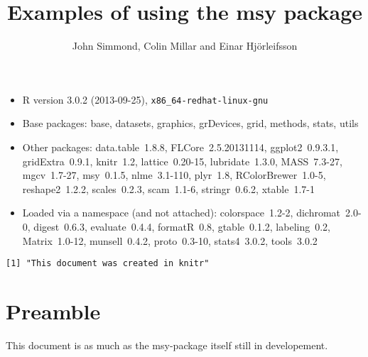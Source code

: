 \documentclass[a4paper]{article}\usepackage{graphicx, color}
\makeatletter
\newenvironment{kframe}{%
 \def\at@end@of@kframe{}%
 \ifinner\ifhmode%
  \def\at@end@of@kframe{\end{minipage}}%
  \begin{minipage}{\columnwidth}%
 \fi\fi%
 \def\FrameCommand##1{\hskip\@totalleftmargin \hskip-\fboxsep
 \colorbox{shadecolor}{##1}\hskip-\fboxsep
     \hskip-\linewidth \hskip-\@totalleftmargin \hskip\columnwidth}%
 \MakeFramed {\advance\hsize-\width
   \@totalleftmargin\z@ \linewidth\hsize
   \@setminipage}}%
 {\par\unskip\endMakeFramed%
 \at@end@of@kframe}
\newenvironment{knitrout}{}{} %
\makeatother
\begin{document}
\title{Examples of using the msy package}

\author{John Simmond, Colin Millar and Einar Hjörleifsson}
\maketitle

\begin{itemize}\raggedright
  \item R version 3.0.2 (2013-09-25), \verb|x86_64-redhat-linux-gnu|
  \item Base packages: base, datasets, graphics, grDevices, grid,
    methods, stats, utils
  \item Other packages: data.table~1.8.8, FLCore~2.5.20131114,
    ggplot2~0.9.3.1, gridExtra~0.9.1, knitr~1.2, lattice~0.20-15,
    lubridate~1.3.0, MASS~7.3-27, mgcv~1.7-27, msy~0.1.5,
    nlme~3.1-110, plyr~1.8, RColorBrewer~1.0-5, reshape2~1.2.2,
    scales~0.2.3, scam~1.1-6, stringr~0.6.2, xtable~1.7-1
  \item Loaded via a namespace (and not attached):
    colorspace~1.2-2, dichromat~2.0-0, digest~0.6.3,
    evaluate~0.4.4, formatR~0.8, gtable~0.1.2, labeling~0.2,
    Matrix~1.0-12, munsell~0.4.2, proto~0.3-10, stats4~3.0.2,
    tools~3.0.2
\end{itemize}



\begin{knitrout}
\color{fgcolor}\begin{kframe}
\begin{verbatim}
[1] "This document was created in knitr"
\end{verbatim}
\end{kframe}
\end{knitrout}

\newpage{}

\section{Preamble}
This document is as much as the msy-package itself still in developement.
\end{document}
